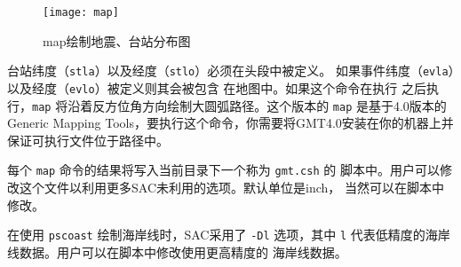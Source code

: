 \begin{figure}[!ht]
\centering
\texttt{[image: map]}
\caption{map绘制地震、台站分布图}
\label{fig:map}
\end{figure}

台站纬度（\texttt{stla}）以及经度（\texttt{stlo}）必须在头段中被定义。
如果事件纬度（\texttt{evla}）以及经度（\texttt{evlo}）被定义则其会被包含
在地图中。如果这个命令在执行  之后执行，\texttt{map}
将沿着反方位角方向绘制大圆弧路径。这个版本的 \texttt{map} 是基于4.0版本的
Generic Mapping Tools，要执行这个命令，你需要将GMT4.0安装在你的机器上并
保证可执行文件位于路径中。

每个 \texttt{map} 命令的结果将写入当前目录下一个称为 \texttt{gmt.csh} 的
脚本中。用户可以修改这个文件以利用更多SAC未利用的选项。默认单位是inch，
当然可以在脚本中修改。

在使用 \texttt{pscoast} 绘制海岸线时，SAC采用了 \texttt{-Dl} 选项，其中
\texttt{l} 代表低精度的海岸线数据。用户可以在脚本中修改使用更高精度的
海岸线数据。
